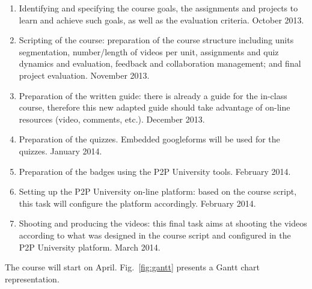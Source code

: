 \documentclass[a4paper,oneside]{book}   %
\begin{document}
\begin{enumerate}
    \item Identifying and specifying the course goals, the assignments and projects to learn and achieve such goals, as well as the evaluation criteria. October 2013.
	\item Scripting of the course: preparation of the course structure including units segmentation, number/length of videos per unit, assignments and quiz dynamics and evaluation, feedback and collaboration management; and final project evaluation. November 2013.
	\item Preparation of the written guide: there is already a guide for the in-class course, therefore this new adapted guide should take advantage of on-line resources (video, comments, etc.). December 2013.
    \item Preparation of the quizzes. 
    Embedded googleforms will be used for the quizzes. January 2014.
    \item Preparation of the badges using the P2P University tools. February 2014.
	\item Setting up the P2P University on-line platform: based on the course script, this task will configure the platform accordingly. February 2014.
	\item Shooting and producing the videos: this final task aims at shooting the videos according to what was designed in the course script and configured in the P2P University platform. March 2014.
\end{enumerate}

The course will start on April.
Fig.~\ref{fig:gantt} presents a Gantt chart representation.
\end{document}
